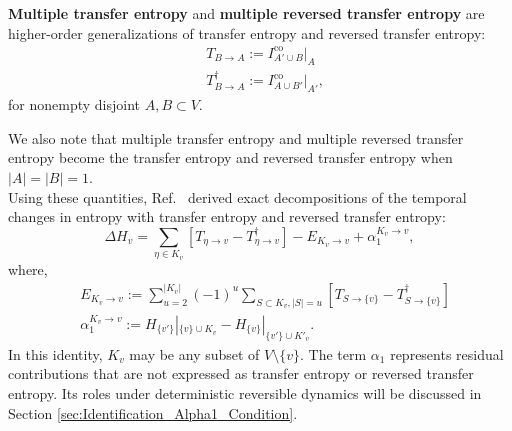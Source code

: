 \documentclass{comnet}%
\begin{document}
\begin{definition}
	\textbf{Multiple transfer entropy} and \textbf{multiple reversed transfer entropy} \cite{Lee2026a} are higher-order generalizations of transfer entropy and reversed transfer entropy:
	\begin{equation}\begin{aligned}
			&T_{B \to A} := I^{\text{co}}_{A' \cup B}|_{A} \\
			&T^{\dagger}_{B \to A} := I^{\text{co}}_{A \cup B'}|_{A'},
	\end{aligned}\end{equation}
	for nonempty disjoint $A, B \subset V$.\\
\end{definition}
We also note that multiple transfer entropy and multiple reversed transfer entropy become the transfer entropy and reversed transfer entropy when $|A| = |B| = 1$.\\

Using these quantities, Ref.~\cite{Lee2026a} derived exact decompositions of the temporal changes in entropy with transfer entropy and reversed transfer entropy:
\begin{equation}
		\Delta H_{v} = \sum_{\eta \in  K_{v}} [T_{\eta \to v} - T^{\dagger}_{\eta \to v}] -  E_{K_{v} \to v} + \alpha_{1}^{K_{v} \to v},
		\label{eq:InfoDyn_H_I}\end{equation}
where,
\begin{equation}\begin{aligned}
		&E_{K_{v} \to v} := \sum_{u=2}^{|K_{v}|} (-1)^{u}\sum_{S \subset  K_{v}, |S|=u} [T_{S \to \{v\}} - T^{\dagger}_{S \to \{v\}}]\\
		&\alpha_{1}^{K_{v} \to v} := H_{\{v'\}}|_{\{v\}\cup K_v} - H_{\{v\}}|_{\{v'\}\cup K'_v}.
\end{aligned}\end{equation}
In this identity, $K_{v}$ may be any subset of $V \setminus \{v\}$. The term $\alpha_{1}$ represents residual contributions that are not expressed as transfer entropy or reversed transfer entropy. Its roles under deterministic reversible dynamics will be discussed in Section \ref{sec:Identification_Alpha1_Condition}.\\
\end{document}
